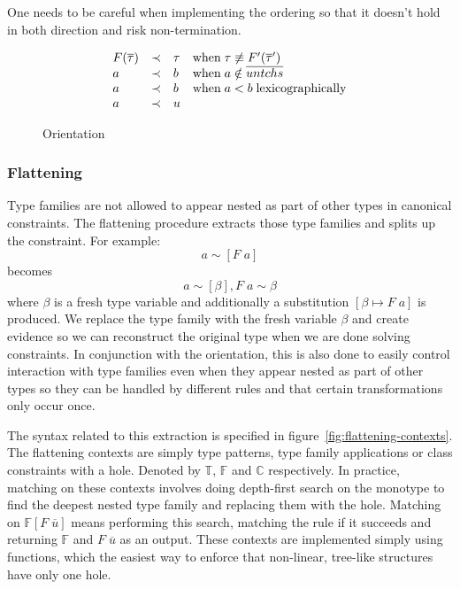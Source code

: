 One needs to be careful when implementing the ordering so that it doesn't hold
in both direction and risk non-termination.

\begin{figure}
\[
\begin{array}{l c l l}
F(\overline{\tau}) &\prec& \tau &\text{when} \; \tau \not\equiv
F'(\overline{\tau}')
\\
a &\prec& b &\text{when} \; a \notin \overline{untchs}
\\
a &\prec& b &\text{when} \; a < b \; \text{lexicographically}
\\
a &\prec& u
\end{array}
\]
\caption{Orientation}
\label{fig:orientation}
\end{figure}

\subsubsection{Flattening}
Type families are not allowed to appear nested as part of other types in
canonical constraints. The flattening procedure extracts those type families and
splits up the constraint. For example: %
$$
a \sim [F \; a]
$$
becomes
$$
a \sim [\beta], F \; a \sim \beta
$$
where $\beta$ is a fresh type variable and additionally a substitution $[\beta
\mapsto F \; a]$ is produced. We replace the type family with the fresh variable
$\beta$ and create evidence so we can reconstruct the original type when we are
done solving constraints. In conjunction with the orientation, this is also done
to easily control interaction with type families even when they appear nested as
part of other types so they can be handled by different rules and that certain
transformations only occur once.


The syntax related to this extraction is specified in
figure~\ref{fig:flattening-contexts}. The flattening contexts are simply type
patterns, type family applications or class constraints with a hole. Denoted by
$\mathbb{T}$, $\mathbb{F}$ and $\mathbb{C}$ respectively. In practice, matching
on these contexts involves doing depth-first search on the monotype to find the
deepest nested type family and replacing them with the hole. Matching on
$\mathbb{F}[F \; \overline{u}]$ means performing this search, matching the rule
if it succeeds and returning $\mathbb{F}$ and $F \; \overline{u}$ as an output.
These contexts are implemented simply using functions, which the easiest way to
enforce that non-linear, tree-like structures have only one hole.

